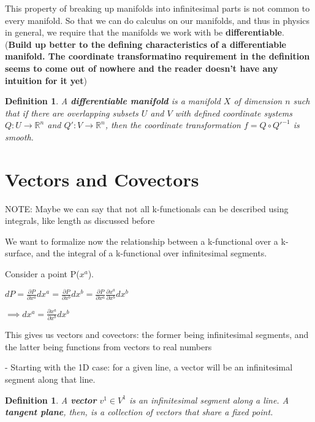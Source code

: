 \documentclass{book}
\newtheorem{defn}[equation]{Definition}
\begin{document}
This property of breaking up manifolds into infinitesimal parts is not common to every manifold. So that we can do calculus on our manifolds, and thus in physics in general, we require that the manifolds we work with be \textbf{differentiable}. (\textbf{Build up better to the defining characteristics of a differentiable manifold. The coordinate transformatino requirement in the definition seems to come out of nowhere and the reader doesn't have any intuition for it yet})


\begin{defn}
	A \textbf{differentiable manifold} is a manifold $X$ of dimension $n$ such that if there are overlapping subsets $U$ and $V$ with defined coordinate systems $Q: U \to \mathbb{R}^n$ and $Q': V \to \mathbb{R}^n$, then the coordinate transformation $f = Q \circ Q'^{-1}$ is smooth. 
\end{defn}





\section{Vectors and Covectors}
NOTE: Maybe we can say that not all k-functionals can be described using integrals, like length as discussed before


We want to formalize now the relationship between a k-functional over a k-surface, and the integral of a k-functional over infinitesimal segments. 

Consider a point P($x^a$).
 
$dP = \frac{\partial P}{\partial x^a} dx^a = \frac{\partial P}{\partial x^b} dx^b = \frac{\partial P}{\partial x^a}\frac{\partial x^a}{\partial x^b} dx^b$

$\implies dx^a = \frac{\partial x^a}{\partial x^b}dx^b $





This gives us vectors and covectors: the former being infinitesimal segments, and the latter being functions from vectors to real numbers

- Starting with the 1D case: for a given line, a vector will be an infinitesimal segment along that line. 


\begin{defn}
	A \textbf{vector} $v^1 \in V^1$ is an infinitesimal segment along a line. A \textbf{tangent plane}, then, is a collection of vectors that share a fixed point. 
\end{defn}
\end{document}
